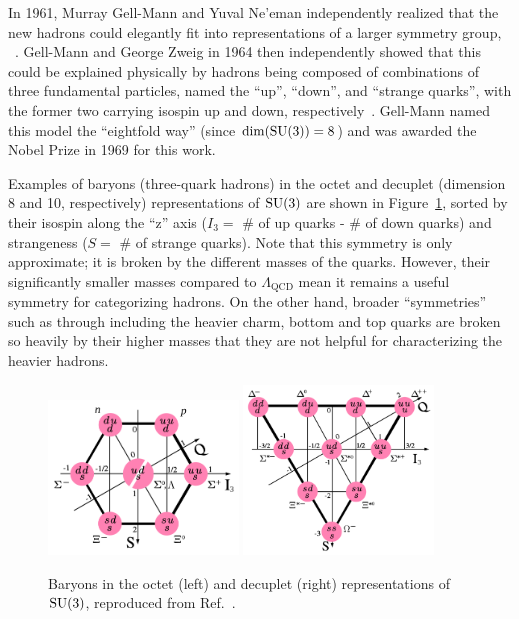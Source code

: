 In 1961, Murray Gell-Mann and Yuval Ne'eman independently realized that the new hadrons could elegantly fit into representations of a larger symmetry group, \SU[3]~\cite{Gell-Mann:1961omu, Neeman:1961jhl}.
Gell-Mann and George Zweig in 1964 then independently showed that this could be explained physically by hadrons being composed of combinations of three fundamental particles, named the ``up'', ``down'', and ``strange quarks'', with the former two carrying isospin up and down, respectively~\cite{Gell-Mann:1964ewy, Zweig:1964jf}.
Gell-Mann named this model the ``eightfold way'' (since $\dim (\SU[3]) = 8$) and was awarded the Nobel Prize in 1969 for this work.

Examples of baryons (three-quark hadrons) in the octet and decuplet (dimension 8 and 10, respectively) representations of $\SU[3]$ are shown in Figure~\ref{fig:01_sm_qcd_eightfoldway}, sorted by their isospin along the ``z'' axis ($I_3 = $ \# of up quarks - \# of down quarks) and strangeness ($S = $ \# of strange quarks).
Note that this \SU[3] symmetry is only approximate; it is broken by the different masses of the quarks.
However, their significantly smaller masses compared to $\Lambda_{\mathrm{QCD}}$ mean it remains a useful symmetry for categorizing hadrons.
On the other hand, broader ``symmetries'' such as \SU[4] through \SU[6] including the heavier charm, bottom and top quarks are broken so heavily by their higher masses that they are not helpful for characterizing the heavier hadrons.

\begin{figure}[ht]
	\centering
	\includegraphics[width=0.45\textwidth]{figures/01-SM-03-SM/qcd/Baryon-octet-small.svg.png}
	\includegraphics[width=0.45\textwidth]{figures/01-SM-03-SM/qcd/Baryon-decuplet-small.svg.png}
	\caption{Baryons in the octet (left) and decuplet (right) representations of $\SU[3]$, reproduced from Ref.~\cite{enwiki:1243626239}.}
	\label{fig:01_sm_qcd_eightfoldway}
\end{figure}

